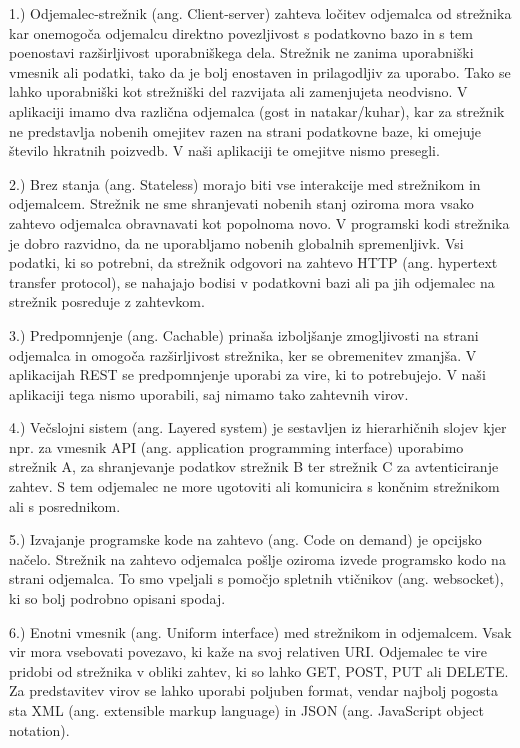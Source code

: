\documentclass[a4paper, 12pt]{book}
\begin{document}
1.) Odjemalec-strežnik (ang. Client-server) zahteva ločitev odjemalca od strežnika kar onemogoča odjemalcu direktno povezljivost s podatkovno bazo in s tem poenostavi razširljivost uporabniškega dela. Strežnik ne zanima uporabniški vmesnik ali podatki, tako da je bolj enostaven in prilagodljiv za uporabo. Tako se lahko uporabniški kot strežniški del razvijata ali zamenjujeta neodvisno. V aplikaciji imamo dva različna odjemalca (gost in natakar/kuhar), kar za strežnik ne predstavlja nobenih omejitev razen na strani podatkovne baze, ki omejuje število hkratnih poizvedb. V naši aplikaciji te omejitve nismo presegli.

2.) Brez stanja (ang. Stateless) morajo biti vse interakcije med strežnikom in odjemalcem. Strežnik ne sme shranjevati nobenih stanj oziroma mora vsako zahtevo odjemalca obravnavati kot popolnoma novo. V programski kodi strežnika je dobro razvidno, da ne uporabljamo nobenih globalnih spremenljivk. Vsi podatki, ki so potrebni, da strežnik odgovori na zahtevo HTTP (ang. hypertext transfer protocol), se nahajajo bodisi v podatkovni bazi ali pa jih odjemalec na strežnik posreduje z zahtevkom.

3.) Predpomnjenje (ang. Cachable) prinaša izboljšanje zmogljivosti na strani odjemalca in omogoča razširljivost strežnika, ker se obremenitev zmanjša. V aplikacijah REST se predpomnjenje uporabi za vire, ki to potrebujejo. V naši aplikaciji tega nismo uporabili, saj nimamo tako zahtevnih virov.

4.) Večslojni sistem (ang. Layered system) je sestavljen iz hierarhičnih slojev kjer npr. za vmesnik API (ang. application programming interface) uporabimo strežnik A, za shranjevanje podatkov strežnik B ter strežnik C za avtenticiranje zahtev. S tem odjemalec ne more ugotoviti ali komunicira s končnim strežnikom ali s posrednikom.

5.) Izvajanje programske kode na zahtevo (ang. Code on demand) je opcijsko načelo. Strežnik na zahtevo odjemalca pošlje oziroma izvede programsko kodo na strani odjemalca. To smo vpeljali s pomočjo spletnih vtičnikov (ang. websocket), ki so bolj podrobno opisani spodaj.

6.) Enotni vmesnik (ang. Uniform interface) med strežnikom in odjemalcem. Vsak vir mora vsebovati povezavo, ki kaže na svoj relativen URI. Odjemalec te vire pridobi od strežnika v obliki zahtev, ki so lahko GET, POST, PUT ali DELETE. Za predstavitev virov se lahko uporabi poljuben format, vendar najbolj pogosta sta XML (ang. extensible markup language) in JSON (ang. JavaScript object notation).
\end{document}
